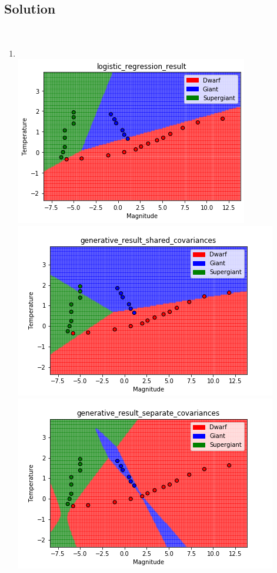\documentclass[submit]{harvardml}
\begin{document}
\subsection*{Solution}\\
\begin{enumerate}
    \item \\ \includegraphics[scale=0.6]{hw2/download (10).png}
    \includegraphics[scale=0.6]{hw2/generative_result_shared_covariances.png}\\
    \includegraphics[scale=0.6]{hw2/generative_result_separate_covariances.png}

\end{enumerate}
\end{document}
